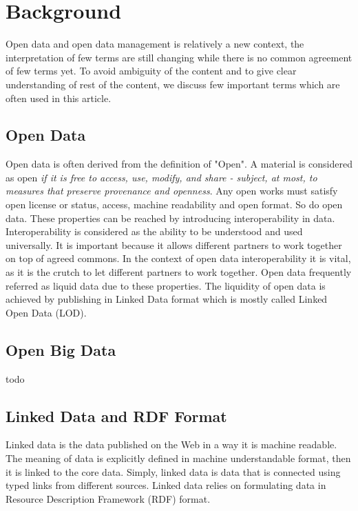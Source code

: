 \section{Background}
Open data and open data management is relatively a new context, the interpretation of few terms are still changing while there is no common agreement of few terms yet.  To avoid ambiguity of the content and to give clear understanding of rest of the content, we discuss few important terms which are often used in this article. 
\subsection{Open Data}
Open data is often derived from the definition of "Open". A material is considered as open \textit{if it is free to access, use, modify, and share - subject, at most, to measures that preserve provenance and openness}. Any open works must satisfy open license or status, access, machine readability and open format\cite{opendefinition}. So do open data. These properties can be reached by introducing  interoperability in data. Interoperability is considered as the ability to be understood and used universally\cite{opendatahandbook}. It is important because it allows different partners to work together on top of agreed commons. In the context of open data interoperability it is vital, as it is the crutch to let different partners to work together. Open data frequently referred as liquid data due to these properties. The liquidity of open data is achieved by publishing in Linked Data format which is mostly called Linked Open Data (LOD). 

\subsection{Open Big Data}
todo

\subsection{Linked Data and RDF Format}
Linked data is the data published on the Web in a way it is machine readable\cite{linkeddatasofar}. The meaning of data is explicitly defined in machine understandable format, then it is linked to the core data. Simply, linked data is data that is connected using typed links from different sources.  Linked data relies on formulating data in Resource Description Framework (RDF) format\cite{rdfdefinition}. 
 
